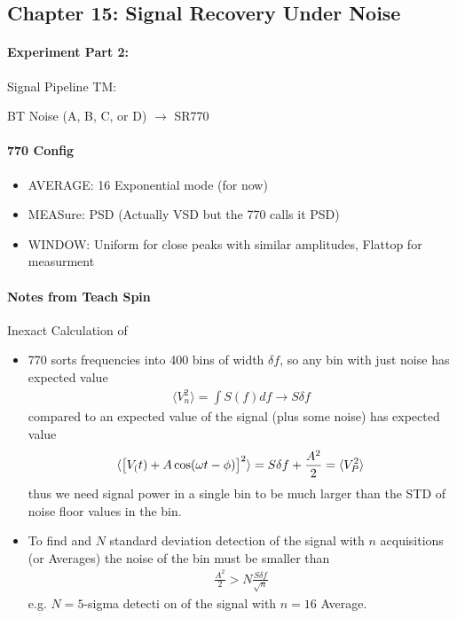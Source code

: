 \documentclass[../main.tex]{subfiles}
\begin{document}
\newpage
{}
\subsection*{Chapter 15: Signal Recovery Under Noise}

\paragraph*{Experiment Part 2:} Signal Pipeline TM:

BT Noise (A, B, C, or D) $\to$ SR770

\paragraph*{770 Config}
\begin{itemize}
    \item AVERAGE: 16 Exponential mode (for now)
    \item MEASure: PSD (Actually VSD but the 770 calls it PSD)  
    \item WINDOW: Uniform for close peaks with similar amplitudes, Flattop for measurment
\end{itemize}

\paragraph*{Notes from Teach Spin} Inexact Calculation of 
\begin{itemize}
    \item 770 sorts frequencies into 400 bins of width $\delta f$, so any bin with just noise has expected value
    \begin{align*}
        \langle V_n^2 \rangle = \int S(f) df \to S \delta f
    \end{align*}
    compared to an expected value of the signal (plus some noise) has expected value
    \begin{align*}
        \langle \qt[V_(t) + A \cos(\omega t -\phi)]^2 \rangle = S \delta f + \frac{A^2}{2} = \langle V_P^2 \rangle
    \end{align*}
    thus we need signal power in a single bin to be much larger than the STD of noise floor values in the bin. 
    \item To find and $N$ standard deviation detection of the signal with $n$ acquisitions (or Averages) the noise of the bin must be smaller than
    \begin{align*}
        \frac{A^2}{2} > N \frac{S \delta f}{\sqrt{n}}
    \end{align*}
    e.g. $N = 5$-sigma detecti on of the signal with $n = 16$ Average. 
\end{itemize}
\end{document}
